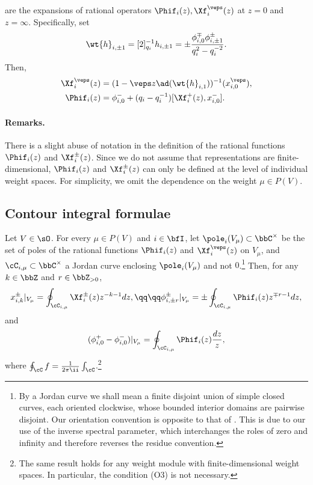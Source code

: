 \documentclass[reqno]{amsart}
\numberwithin{equation}{section}
\newenvironment{remarks}{\medskip\paragraph{{\bf Remarks.} }}{\par\medskip}
\begin{document}
are the expansions of rational operators $\Phif_i(z), \Xf_i^{\veps}(z)$ at $z=0$ and $z=\infty$. Specifically, set 
\begin{equation}\label{eq:H1}
\wt{h}_{i,\pm 1}
=[2]_{q_i}^{-1}h_{i,\pm1}=\pm\frac{\phi_{i,0}^{\mp}\phi_{i,\pm1}^{\pm}}{q^2_i-q^{-2}_i}.
\end{equation} Then,
\begin{align}\label{eq:QL-rational-gen-X}
\Xf_i^{\veps}(z)&=(1-\veps z\ad(\wt{h}_{i,1}))^{-1}(x_{i,0}^{\veps}),\\
\Phif_i(z)&=\phi^{-}_{i,0}+(q_i-q_i^{-1})[\Xf_i^+(z), x_{i,0}^-].
\end{align}

\begin{remarks}
	There is a slight abuse of notation in the definition of the rational functions $\Phif_i(z)$ and $\Xf_i^{\pm}(z)$. Since we do not assume that representations are finite-dimensional, $\Phif_i(z)$ and $\Xf_i^{\pm}(z)$ can only be defined at the level of individual weight spaces. For simplicity, we omit the dependence on the weight $\mu \in P(V)$.\hfill\rmkend
\end{remarks}

\subsection{Contour integral formulae \cite{gautam-toledano-17}}\label{ss:QL-contour}
Let $V\in\sO$. For every $\mu\in P(V)$ and $i\in\bfI$, let $\pole_i(V_\mu)\subset\bbC^\times$
be the set of poles of the rational functions $\Phif_i(z)$ and $\Xf^\veps_i(z)$ on $V_\mu$, and $\cC_{i,\mu}\subset\bbC^\times$ a Jordan curve enclosing $\pole_i(V_\mu)$ and not $0$.\footnote{By a Jordan curve we shall mean a finite disjoint union of simple closed curves, each oriented clockwise, whose bounded interior domains are pairwise disjoint. Our orientation convention is opposite to that of \cite{gautam-toledano-17}. This is due to our use of the inverse spectral parameter, which interchanges the roles of zero and infinity and therefore reverses the residue convention.} Then, for any $k\in\bbZ$ and $r\in\bbZ_{>0}$,
\begin{equation}\label{eq:contour-X-Phi}
x_{i,k}^{\pm}\vert_{V_\mu}=\oint_{\cC_{i,\mu}}\Xf_i^{\pm}(z)z^{-k-1}dz,
\qq\qq
\phi_{i,\pm r}^{\pm}\vert_{V_\mu}=\pm\oint_{\cC_{i,\mu}}\Phif_i(z)z^{\mp r-1}dz,
\end{equation}
and
\begin{equation}\label{eq:contour-Phi-0}
(\phi_{i,0}^+-\phi_{i,0}^-)\vert_{V_{\mu}}=	\oint_{\cC_{i,\mu}}\Phif_i(z)\frac{dz}{z},
\end{equation}
where $\oint_{\cC} f=\frac{1}{2\pi\ii}\int_{\cC}$.\footnote{
The same result holds for any weight module with finite-dimensional weight spaces. In particular, the condition (O3) is not necessary.}
\end{document}
